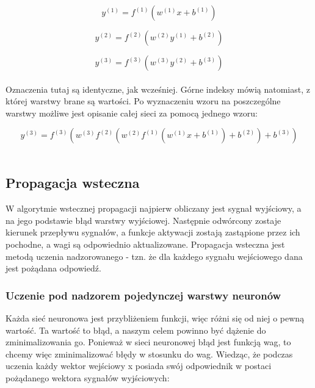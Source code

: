 \documentclass[a4paper, 12pt]{article}
\begin{document}
\begin{equation}
y^{(1)} = f^{(1)}\left( w^{(1)}x + b^{(1)} \right)
\label{Eq:2.9}
\end{equation}

\begin{equation}
y^{(2)} = f^{(2)}\left( w^{(2)}y^{(1)} + b^{(2)} \right)
\label{Eq:2.10}
\end{equation}

\begin{equation}
y^{(3)} = f^{(3)} \left( w^{(3)}y^{(2)} + b^{(3)} \right)
\label{Eq:2.11}
\end{equation}\\
Oznaczenia tutaj są identyczne, jak wcześniej. Górne indeksy mówią natomiast, z której warstwy brane są wartości.
Po wyznaczeniu wzoru na poszczególne warstwy możliwe jest opisanie całej sieci za pomocą jednego wzoru:

\begin{equation}
y^{(3)} = f^{(3)} \left(w^{(3)} f^{(2)}\left( w^{(2)} f^{(1)}\left( w^{(1)}x + b^{(1)} \right)+ b^{(2)} \right) + b^{(3)} \right)
\label{Eq:2.12}
\end{equation}\\

\subsection{Propagacja wsteczna}
W algorytmie wstecznej propagacji najpierw obliczany jest sygnał wyjściowy, a na jego podstawie błąd warstwy wyjściowej. Następnie odwórcony zostaje kierunek przepływu sygnałów, a funkcje aktywacji zostają zastąpione przez ich pochodne, a wagi są odpowiednio aktualizowane.
Propagacja wsteczna jest metodą uczenia nadzorowanego - tzn. że dla każdego sygnału wejściowego dana jest pożądana odpowiedź.\\

\subsubsection{Uczenie pod nadzorem pojedynczej warstwy neuronów}
Każda sieć neuronowa jest przybliżeniem funkcji, więc różni się od niej o pewną wartość. Ta wartość to błąd, a naszym celem powinno być dążenie do zminimalizowania go. Ponieważ w sieci neuronowej błąd jest funkcją wag, to chcemy więc zminimalizować błędy w stosunku do wag. 
Wiedząc, że podczas uczenia każdy wektor wejściowy x posiada swój odpowiednik w postaci pożądanego wektora sygnałów wyjściowych:
\end{document}
